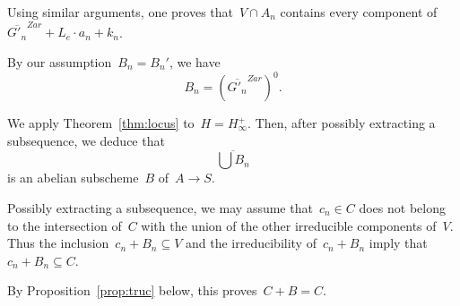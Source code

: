 \documentclass[12pt]{amsart}
\newcommand{\ol}{\overline}
\begin{document}
Using similar arguments, one proves that~$V\cap A_n$ contains every component of~$\ol{G'_n}^{Zar}+L_e\cdot a_n+k_n$.

By our assumption~$B_n=B_n'$, we have 
\[
B_n=(\ol{G'_n}^{Zar})^0.
\]

We apply Theorem~\ref{thm:locus} to~$H=H^+_\infty$. Then, after possibly extracting a subsequence, we deduce that
\[
\ol{\bigcup B_n}
\]
is an abelian subscheme~$B$ of~$A\to S$.

Possibly extracting a subsequence, we may assume that~$c_n\in C$ does not belong to the intersection of~$C$ with the union of the other irreducible components of~$V$. Thus the inclusion~$c_n+B_n\subseteq V$ and the irreducibility of~$c_n+B_n$ imply that~$c_n+B_n\subseteq C$.

By Proposition~\ref{prop:truc} below, this proves~$C+B=C$.
\end{document}
